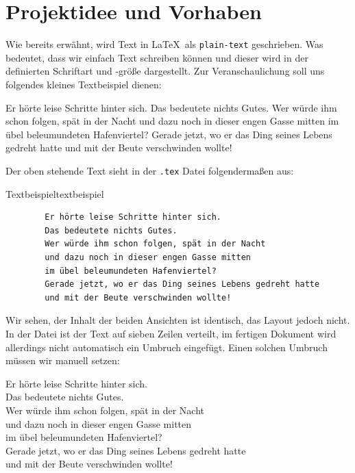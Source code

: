 \section{Projektidee und Vorhaben}

Wie bereits erwähnt, wird Text in \LaTeX~als \texttt{plain-text} geschrieben.
Was bedeutet, dass wir einfach Text schreiben können und dieser wird in der
definierten Schriftart und -größe dargestellt. Zur Veranschaulichung soll uns
folgendes kleines Textbeispiel dienen:

Er hörte leise Schritte hinter sich.
Das bedeutete nichts Gutes.
Wer würde ihm schon folgen, spät in der Nacht
und dazu noch in dieser engen Gasse mitten
im übel beleumundeten Hafenviertel?
Gerade jetzt, wo er das Ding seines Lebens gedreht hatte
und mit der Beute verschwinden wollte!

Der oben stehende Text sieht in der \texttt{.tex} Datei folgendermaßen aus:
\begin{code}{Textbeispiel}{textbeispiel}
	\begin{verbatim}
		Er hörte leise Schritte hinter sich. 
		Das bedeutete nichts Gutes. 
		Wer würde ihm schon folgen, spät in der Nacht 
		und dazu noch in dieser engen Gasse mitten 
		im übel beleumundeten Hafenviertel? 
		Gerade jetzt, wo er das Ding seines Lebens gedreht hatte 
		und mit der Beute verschwinden wollte! 
	\end{verbatim}
\end{code}

Wir sehen, der Inhalt der beiden Ansichten ist identisch, das Layout jedoch
nicht. In der Datei ist der Text auf sieben Zeilen verteilt, im fertigen
Dokument wird allerdings nicht automatisch ein Umbruch eingefügt. Einen solchen
Umbruch müssen wir manuell setzen:

Er hörte leise Schritte hinter sich.\\
Das bedeutete nichts Gutes.\\
Wer würde ihm schon folgen, spät in der Nacht\\
und dazu noch in dieser engen Gasse mitten\\
im übel beleumundeten Hafenviertel?\\
Gerade jetzt, wo er das Ding seines Lebens gedreht hatte\\
und mit der Beute verschwinden wollte!

